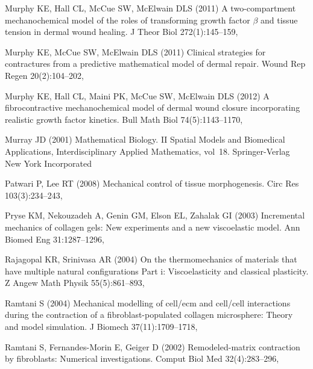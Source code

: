 \begin{thebibliography}{124}
Murphy KE, Hall CL, McCue SW, McElwain DLS (2011{}) A
  two-compartment mechanochemical model of the roles of transforming growth
  factor $\beta$ and tissue tension in dermal wound healing. J Theor Biol
  272(1):145--159, 

Murphy KE, McCue SW, McElwain DLS (2011{}) Clinical strategies for
  contractures from a predictive mathematical model of dermal repair. Wound Rep
  Regen 20(2):104--202, 

Murphy KE, Hall CL, Maini PK, McCue SW, McElwain DLS (2012) A fibrocontractive
  mechanochemical model of dermal wound closure incorporating realistic growth
  factor kinetics. Bull Math Biol 74(5):1143--1170,

Murray JD (2001) Mathematical Biology. II Spatial Models and Biomedical
  Applications, Interdisciplinary Applied Mathematics, vol~18. Springer-Verlag
  New York Incorporated

Patwari P, Lee RT (2008) Mechanical control of tissue morphogenesis. Circ Res
  103(3):234--243, 

Pryse KM, Nekouzadeh A, Genin GM, Elson EL, Zahalak GI (2003) Incremental
  mechanics of collagen gels: {N}ew experiments and a new viscoelastic model.
  Ann Biomed Eng 31:1287--1296, 

Rajagopal KR, Srinivasa AR (2004) On the thermomechanics of materials that have
  multiple natural configurations {P}art i: {V}iscoelasticity and classical
  plasticity. Z Angew Math Physik 55(5):861--893,

Ramtani S (2004) Mechanical modelling of cell/ecm and cell/cell interactions
  during the contraction of a fibroblast-populated collagen microsphere: Theory
  and model simulation. J Biomech 37(11):1709--1718,

Ramtani S, Fernandes-Morin E, Geiger D (2002) Remodeled-matrix contraction by
  fibroblasts: {N}umerical investigations. Comput Biol Med 32(4):283--296,


\end{thebibliography}
